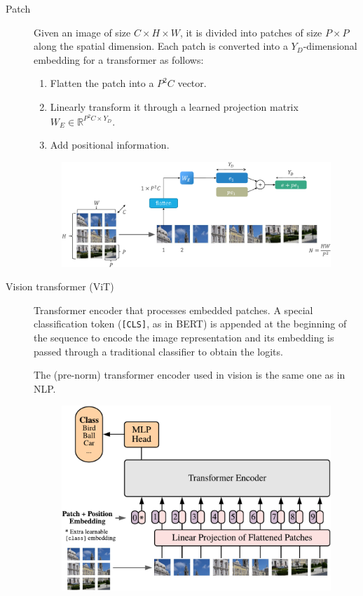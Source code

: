 \begin{description}
    \item[Patch] 
        Given an image of size $C \times H \times W$, it is divided into patches of size $P \times P$ along the spatial dimension. Each patch is converted into a $Y_D$-dimensional embedding for a transformer as follows:
        \begin{enumerate}
            \item Flatten the patch into a $P^2C$ vector.
            \item Linearly transform it through a learned projection matrix $W_E \in \mathbb{R}^{P^2C \times Y_D}$.
            \item Add positional information.
        \end{enumerate}

        \begin{figure}[H]
            \centering
            \includegraphics[width=0.8\linewidth]{./img/_vit_patch.pdf}
        \end{figure}

    \item[Vision transformer (ViT)] 
        Transformer encoder that processes embedded patches. A special classification token (\texttt{[CLS]}, as in BERT) is appended at the beginning of the sequence to encode the image representation and its embedding is passed through a traditional classifier to obtain the logits.

        \begin{remark}
            The (pre-norm) transformer encoder used in vision is the same one as in NLP.
        \end{remark}

        \begin{figure}[H]
            \centering
            \includegraphics[width=0.55\linewidth]{./img/_vision_transformer.pdf}
        \end{figure}
\end{description}